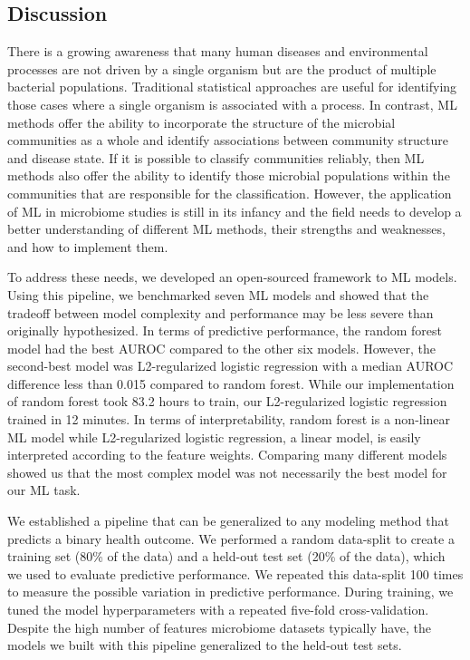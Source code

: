 \documentclass[11pt,]{article}
\begin{document}
\subsection{Discussion}\label{discussion}

There is a growing awareness that many human diseases and environmental
processes are not driven by a single organism but are the product of
multiple bacterial populations. Traditional statistical approaches are
useful for identifying those cases where a single organism is associated
with a process. In contrast, ML methods offer the ability to incorporate
the structure of the microbial communities as a whole and identify
associations between community structure and disease state. If it is
possible to classify communities reliably, then ML methods also offer
the ability to identify those microbial populations within the
communities that are responsible for the classification. However, the
application of ML in microbiome studies is still in its infancy and the
field needs to develop a better understanding of different ML methods,
their strengths and weaknesses, and how to implement them.

To address these needs, we developed an open-sourced framework to ML
models. Using this pipeline, we benchmarked seven ML models and showed
that the tradeoff between model complexity and performance may be less
severe than originally hypothesized. In terms of predictive performance,
the random forest model had the best AUROC compared to the other six
models. However, the second-best model was L2-regularized logistic
regression with a median AUROC difference less than 0.015 compared to
random forest. While our implementation of random forest took 83.2 hours
to train, our L2-regularized logistic regression trained in 12 minutes.
In terms of interpretability, random forest is a non-linear ML model
while L2-regularized logistic regression, a linear model, is easily
interpreted according to the feature weights. Comparing many different
models showed us that the most complex model was not necessarily the
best model for our ML task.

We established a pipeline that can be generalized to any modeling method
that predicts a binary health outcome. We performed a random data-split
to create a training set (80\% of the data) and a held-out test set
(20\% of the data), which we used to evaluate predictive performance. We
repeated this data-split 100 times to measure the possible variation in
predictive performance. During training, we tuned the model
hyperparameters with a repeated five-fold cross-validation. Despite the
high number of features microbiome datasets typically have, the models
we built with this pipeline generalized to the held-out test sets.
\end{document}
